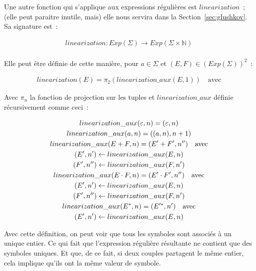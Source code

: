 \vphantom{}

Une autre fonction qui s'applique aux expressions régulières est
\(linearization\)~; (elle peut paraitre inutile, mais) elle nous servira dans
la Section~\ref{sec:glushkov}. Sa signature est~:

\begin{gather*}
    linearization: Exp(\Sigma) \to Exp(\Sigma \times \mathbb{N}) \\
\end{gather*}

Elle peut être définie de cette manière, pour \(a \in \Sigma\) et \((E, F) \in
(Exp(\Sigma))^2\)~:

\begin{gather*}
    linearization(E) = \pi_2(linearization\_aux(E, 1)) \quad \text{avec}
\end{gather*}

\noindent Avec \(\pi_n\) la fonction de projection sur les tuples et
\(linearization\_aux\) définie récursivement comme ceci~:

\begin{gather*}
    linearization\_aux(\varepsilon, n) = (\varepsilon, n) \\
    linearization\_aux(a, n) = ((a, n), n + 1) \\
    linearization\_aux(E + F, n) = (E' + F', n'') \quad \text{avec} \\
    (E', n') \leftarrow linearization\_aux(E, n) \notag \\
    (F', n'') \leftarrow linearization\_aux(F, n') \notag \\
    linearization\_aux(E \cdot F, n) = (E' \cdot F', n'') \quad \text{avec} \\
    (E', n') \leftarrow linearization\_aux(E, n) \notag \\
    (F', n'') \leftarrow linearization\_aux(F, n') \notag \\
    linearization\_aux(E^*, n) = (E'^*, n') \quad \text{avec} \\
    (E', n') \leftarrow linearization\_aux(E, n) \notag
\end{gather*}

Avec cette définition, on peut voir que tous les symboles sont associés à un
unique entier. Ce qui fait que l'expression régulière résultante ne contient
que des symboles uniques. Et que, de ce fait, si deux couples partagent le même
entier, cela implique qu'ils ont la même valeur de symbole.

